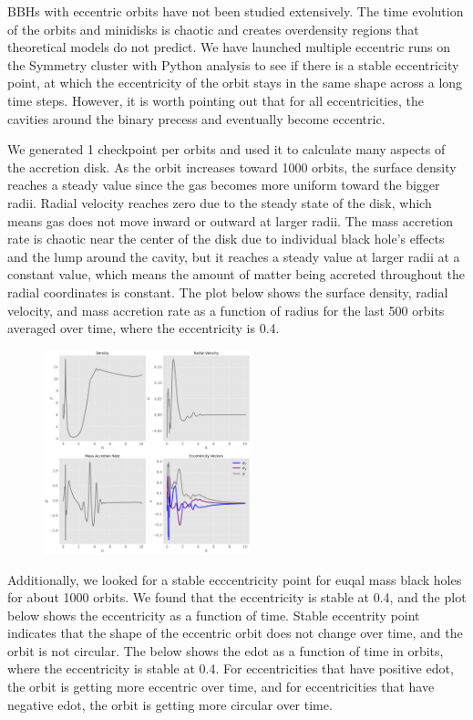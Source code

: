 \documentclass{article}
\begin{document}
BBHs with eccentric orbits have not been studied extensively. 
The time evolution of the orbits and minidisks is chaotic and creates 
overdensity regions that theoretical models do not predict. We have launched multiple eccentric 
runs on the Symmetry cluster with Python analysis to see if there is a stable eccentricity point, 
at which the eccentricity of the orbit stays in the same shape across a long time steps.
 However, it is worth pointing out that for all eccentricities, the cavities
 around the binary precess and eventually become eccentric.

We generated 1 checkpoint per orbits and used it to calculate many aspects of the accretion disk. 
As the orbit increases toward 1000 orbits, the surface density reaches a steady value since the gas becomes more uniform toward the bigger radii. 
Radial velocity reaches zero due to the steady state of the disk, which means gas does not move inward or outward at larger radii.
The mass accretion rate is chaotic near the center of the disk due to individual black hole's effects and the lump around the cavity, 
but it reaches a steady value at larger radii at a constant value, which means the amount of matter being accreted throughout the radial coordinates
is constant. The plot below shows the surface density, radial velocity, and mass accretion rate as a function of radius for the last 500 orbits averaged over time, where the eccentricity is 0.4.

\begin{figure}[h]
    \includegraphics[width=6cm]{output.png}
    \centering
    \end{figure}

Additionally, we looked for a stable ecccentricity point for euqal mass black holes for about 1000 orbits. We found that the eccentricity is stable at 0.4, and the plot below shows the eccentricity as a function of time.
Stable eccentrity point indicates that the shape of the eccentric orbit does not change over time, and the orbit is not circular. The below shows the edot as a function of time in orbits, where the eccentricity is stable at 0.4.
For eccentricities that have positive edot, the orbit is getting more eccentric over time, and for eccentricities that have negative edot, the orbit is getting more circular over time.
\end{document}

